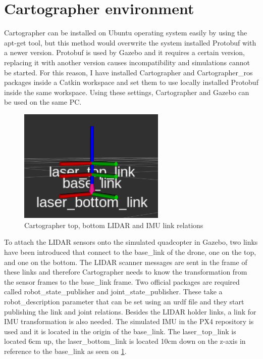 \section{Cartographer environment} \label{sect:cartographer_environment}
Cartographer can be installed on Ubuntu operating system easily by using the apt-get tool, but this
method would overwrite the system installed Protobuf with a newer version. Protobuf is used by
Gazebo and it requires a certain version, replacing it with another version causes incompatibility
and simulations cannot be started. For this reason, I have installed Cartographer and Cartographer\_ros
packages inside a Catkin workspace and set them to use locally installed Protobuf inside the same
workspace. Using these settings, Cartographer and Gazebo can be used on the same PC.

\begin{figure}[!ht]
    \centering
    \includegraphics[width=70mm, keepaspectratio]{figures/cartographer_tf_setup.png}
    \caption{Cartographer top, bottom LIDAR and IMU link relations}
    \label{fig:cartographer_tf_setup}
\end{figure}


To attach the LIDAR sensors onto the simulated quadcopter in Gazebo, two links have been introduced that
connect to the base\_link of the drone, one on the top, and one on the bottom. The LIDAR scanner messages
are sent in the frame of these links and therefore Cartographer needs to know the transformation from the
sensor frames to the base\_link frame. Two official packages are required called robot\_state\_publisher
and joint\_state\_publisher. These take a robot\_description parameter that can be set using an urdf file
and they start publishing the link and joint relations. Besides the LIDAR holder links, a link for IMU
transformation is also needed. The simulated IMU in the PX4 repository is used and it is located in
the origin of the base\_link. The laser\_top\_link is located 6cm up, the laser\_bottom\_link is located 10cm down
on the z-axis in reference to the base\_link as seen on \ref{fig:cartographer_tf_setup}.


